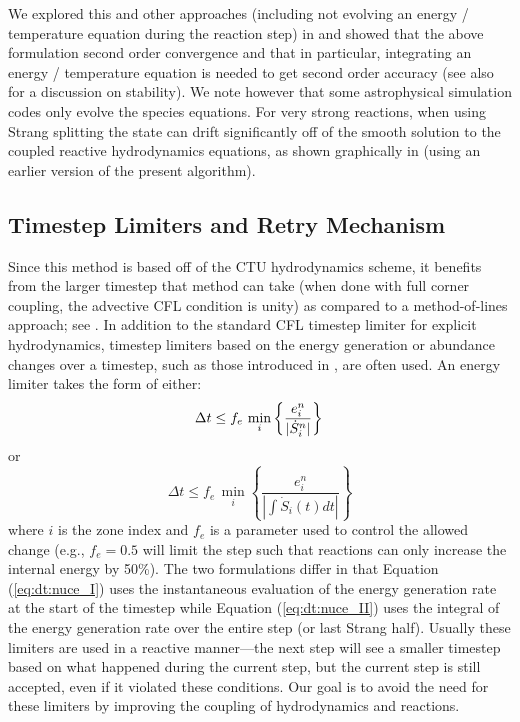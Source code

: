 \documentclass[linenumbers,trackchanges]{aastex631}
\newcommand{\MarginPar}[1]{\marginpar{\vskip-\baselineskip\raggedright\tiny\sffamily\hrule\smallskip{\color{red}#1}\par\smallskip\hrule}}
\begin{document}
We explored this and other approaches (including not evolving an
energy / temperature equation during the reaction step) in
\citet{strang_rnaas} and showed that the above formulation  second
order convergence and that in particular, integrating an energy / temperature
equation is needed to get second order accuracy (see also
\citealt{muller:1986} for a discussion on stability).  We note however
that some astrophysical simulation codes only evolve the species
equations.  For very strong reactions, when using Strang splitting the
state can drift significantly off of the smooth solution to the
coupled reactive hydrodynamics equations, as shown graphically in
\citet{astronum:2018} (using an earlier version of the present
algorithm).  


\subsection{Timestep Limiters and Retry Mechanism}

Since this method is based off of the CTU hydrodynamics scheme, it
benefits from the larger timestep that method can take (when done with
full corner coupling, the advective CFL condition is unity) as
compared to a method-of-lines approach; see \cite{ppmunsplit}.  In
addition to the standard CFL timestep limiter for explicit
hydrodynamics, timestep limiters based on
the energy generation or abundance changes over a timestep, such as
those introduced in \cite{prometheus}, are often used.  An energy limiter takes the
form of either:
\begin{equation}
\label{eq:dt:nuce_I}
\Delta t \le f_e\, \min_{i} \left\{\frac{e^n_{i}}{|\dot{S}_{i}^n|}\right\} \\
\end{equation}
or
\begin{equation}
\label{eq:dt:nuce_II}
\Delta t \le f_e\, \min_{i} \left\{ \frac{e^n_i}{|\int \dot{S}_i(t) dt|} \right\}
\end{equation}
where $i$ is the zone index and $f_e$ is a parameter used to control
the allowed change (e.g., $f_e = 0.5$ will limit the step such that
reactions can only increase the internal energy by 50\%).  The two
formulations differ in that Equation (\ref{eq:dt:nuce_I}) uses the
instantaneous evaluation of the energy generation rate at the start of
the timestep while Equation (\ref{eq:dt:nuce_II}) uses the integral of the
energy generation rate over the entire step (or last Strang half).
Usually these limiters are used in a reactive manner---the next step will see
a smaller timestep based on what happened during the current step, but the
current step is still accepted, even if it violated these conditions.  Our
goal is to avoid the need for these limiters by improving the coupling of hydrodynamics
and reactions.
\end{document}
